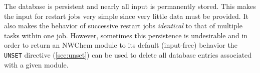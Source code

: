 \fussy

The database is persistent and nearly all input is permanently stored.
This makes the input for restart jobs very simple since very little
data must be provided.  It also makes the behavior of successive
restart jobs {\em identical} to that of multiple tasks within one job.
However, sometimes this persistence is undesirable and in order to
return an NWChem module to its default (input-free) behavior the
\verb+UNSET+ directive (\ref{sec:unset}) can be used to delete all
database entries associated with a given module.

